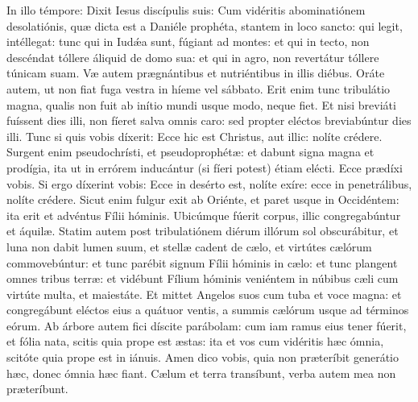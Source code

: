 \begin{latinproper}
In illo témpore: Dixit Iesus discípulis suis: Cum vidéritis abominatiónem
desolatiónis, quæ dicta est a Daniéle prophéta, stantem in loco sancto: qui
legit, intéllegat: tunc qui in Iudǽa sunt, fúgiant ad montes: et qui in
tecto, non descéndat tóllere áliquid de domo sua: et qui in agro, non
revertátur tóllere túnicam suam. Væ autem prægnántibus et nutriéntibus in
illis diébus. Oráte autem, ut non fiat fuga vestra in híeme vel sábbato. Erit
enim tunc tribulátio magna, qualis non fuit ab inítio mundi usque modo,
neque fiet. Et nisi breviáti fuíssent dies illi, non fíeret salva omnis
caro: sed propter eléctos breviabúntur dies illi. Tunc si quis vobis
díxerit: Ecce hic est Christus, aut illic: nolíte crédere. Surgent enim
pseudochrísti, et pseudoprophétæ: et dabunt signa magna et prodígia, ita ut
in errórem inducántur (si fíeri potest) étiam elécti. Ecce prædíxi vobis. Si
ergo díxerint vobis: Ecce in desérto est, nolíte exíre: ecce in
penetrálibus, nolíte crédere. Sicut enim fulgur exit ab Oriénte, et paret
usque in Occidéntem: ita erit et advéntus Fílii hóminis. Ubicúmque fúerit
corpus, illic congregabúntur et áquilæ. Statim autem post tribulatiónem
diérum illórum sol obscurábitur, et luna non dabit lumen suum, et stellæ
cadent de cælo, et virtútes cælórum commovebúntur: et tunc parébit signum
Fílii hóminis in cælo: et tunc plangent omnes tribus terræ: et vidébunt
Fílium hóminis veniéntem in núbibus cæli cum virtúte multa, et maiestáte. Et
mittet Angelos suos cum tuba et voce magna: et congregábunt eléctos eius a
quátuor ventis, a summis cælórum usque ad términos eórum. Ab árbore autem
fici díscite parábolam: cum iam ramus eius tener fúerit, et fólia nata,
scitis quia prope est æstas: ita et vos cum vidéritis hæc ómnia, scitóte
quia prope est in iánuis. Amen dico vobis, quia non præteríbit generátio
hæc, donec ómnia hæc fiant. Cælum et terra transíbunt, verba autem mea non
præteríbunt.
\end{latinproper}

